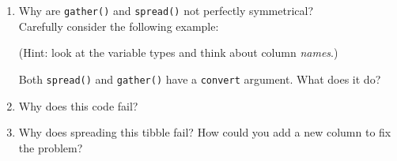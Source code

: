 \documentclass[]{book}
\newenvironment{Shaded}{\begin{snugshade}}{\end{snugshade}}
\newcommand{\KeywordTok}[1]{\textcolor[rgb]{0.13,0.29,0.53}{\textbf{{#1}}}}
\newcommand{\DataTypeTok}[1]{\textcolor[rgb]{0.13,0.29,0.53}{{#1}}}
\newcommand{\DecValTok}[1]{\textcolor[rgb]{0.00,0.00,0.81}{{#1}}}
\newcommand{\FloatTok}[1]{\textcolor[rgb]{0.00,0.00,0.81}{{#1}}}
\newcommand{\StringTok}[1]{\textcolor[rgb]{0.31,0.60,0.02}{{#1}}}
\newcommand{\CommentTok}[1]{\textcolor[rgb]{0.56,0.35,0.01}{\textit{{#1}}}}
\newcommand{\NormalTok}[1]{{#1}}
\begin{document}
\begin{enumerate}
\def\labelenumi{\arabic{enumi}.}
\item
  Why are \texttt{gather()} and \texttt{spread()} not perfectly
  symmetrical?\\
  Carefully consider the following example:

\begin{Shaded}
\end{Shaded}

  (Hint: look at the variable types and think about column
  \emph{names}.)

  Both \texttt{spread()} and \texttt{gather()} have a \texttt{convert}
  argument. What does it do?
\item
  Why does this code fail?

\begin{Shaded}
\end{Shaded}
\item
  Why does spreading this tibble fail? How could you add a new column to
  fix the problem?


\end{enumerate}
\end{document}
